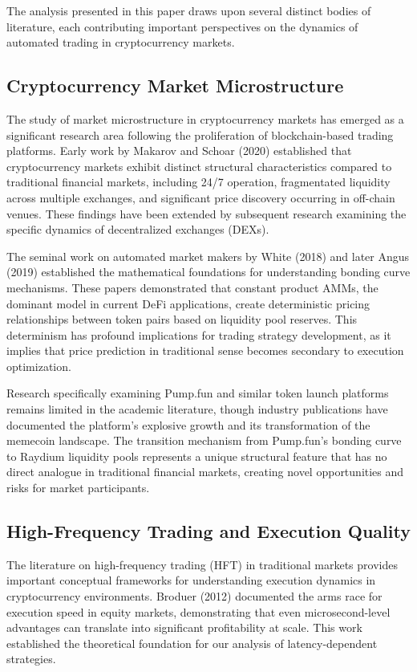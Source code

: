 \documentclass[12pt,a4paper]{article}
\begin{document}
The analysis presented in this paper draws upon several distinct bodies of literature, each contributing important perspectives on the dynamics of automated trading in cryptocurrency markets.

\subsection{Cryptocurrency Market Microstructure}

The study of market microstructure in cryptocurrency markets has emerged as a significant research area following the proliferation of blockchain-based trading platforms. Early work by Makarov and Schoar (2020) established that cryptocurrency markets exhibit distinct structural characteristics compared to traditional financial markets, including 24/7 operation, fragmentated liquidity across multiple exchanges, and significant price discovery occurring in off-chain venues. These findings have been extended by subsequent research examining the specific dynamics of decentralized exchanges (DEXs).

The seminal work on automated market makers by White (2018) and later Angus (2019) established the mathematical foundations for understanding bonding curve mechanisms. These papers demonstrated that constant product AMMs, the dominant model in current DeFi applications, create deterministic pricing relationships between token pairs based on liquidity pool reserves. This determinism has profound implications for trading strategy development, as it implies that price prediction in traditional sense becomes secondary to execution optimization.

Research specifically examining Pump.fun and similar token launch platforms remains limited in the academic literature, though industry publications have documented the platform's explosive growth and its transformation of the memecoin landscape. The transition mechanism from Pump.fun's bonding curve to Raydium liquidity pools represents a unique structural feature that has no direct analogue in traditional financial markets, creating novel opportunities and risks for market participants.

\subsection{High-Frequency Trading and Execution Quality}

The literature on high-frequency trading (HFT) in traditional markets provides important conceptual frameworks for understanding execution dynamics in cryptocurrency environments. Broduer (2012) documented the arms race for execution speed in equity markets, demonstrating that even microsecond-level advantages can translate into significant profitability at scale. This work established the theoretical foundation for our analysis of latency-dependent strategies.
\end{document}
